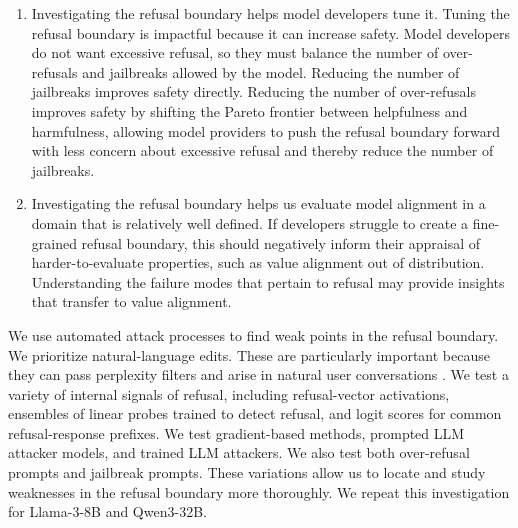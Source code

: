 \documentclass{article}
\begin{document}
\begin{enumerate}
    \item Investigating the refusal boundary helps model developers tune it. Tuning the refusal boundary is impactful because it can increase safety. Model developers do not want excessive refusal, so they must balance the number of over-refusals and jailbreaks allowed by the model. Reducing the number of jailbreaks improves safety directly. Reducing the number of over-refusals improves safety by shifting the Pareto frontier between helpfulness and harmfulness, allowing model providers to push the refusal boundary forward with less concern about excessive refusal and thereby reduce the number of jailbreaks.

    \item Investigating the refusal boundary helps us evaluate model alignment in a domain that is relatively well defined. If developers struggle to create a fine-grained refusal boundary, this should negatively inform their appraisal of harder-to-evaluate properties, such as value alignment out of distribution. Understanding the failure modes that pertain to refusal may provide insights that transfer to value alignment.
\end{enumerate}

We use automated attack processes to find weak points in the refusal boundary. We prioritize natural-language edits. These are particularly important because they can pass perplexity filters and arise in natural user conversations \citep{wichers2024gradient}. We test a variety of internal signals of refusal, including refusal-vector activations, ensembles of linear probes trained to detect refusal, and logit scores for common refusal-response prefixes. We test gradient-based methods, prompted LLM attacker models, and trained LLM attackers. We also test both over-refusal prompts and jailbreak prompts. These variations allow us to locate and study weaknesses in the refusal boundary more thoroughly. We repeat this investigation for Llama-3-8B and Qwen3-32B.
\end{document}
